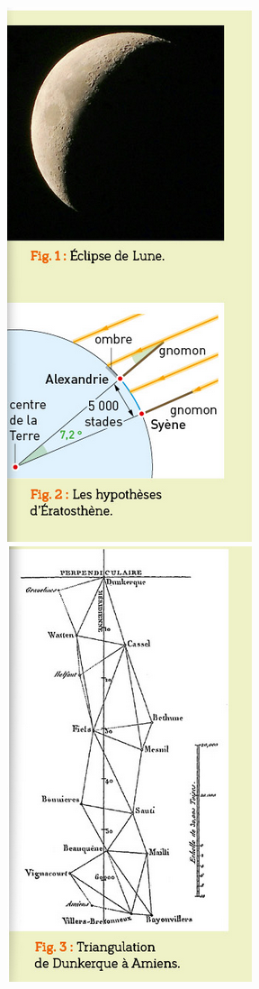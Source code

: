\documentclass[10pt]{article}
\newcommand{\myscale}{0.55}
\begin{document}
\begin{center}
\begin{minipage}[c]{0.6\textwidth}
	\end{minipage}
	\hspace{0.05\textwidth}
	\begin{minipage}[c]{0.34\textwidth}
		\centering
		\includegraphics[scale=\myscale]{assets/1i.png}
		\includegraphics[scale=\myscale]{assets/1ii.png}
	\end{minipage}


\end{center}
\end{document}
